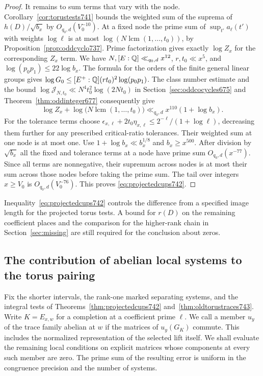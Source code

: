 \documentclass[a4paper,11pt]{article}
\theoremstyle{definition}
\theoremstyle{remark}
\numberwithin{equation}{section}
\begin{document}
\begin{proof}
It remains to sum terms that vary with the node.
Corollary~\ref{cor:torustests741} bounds the weighted sum of
the suprema of \(h(D)/\sqrt{b_x}\) by \(O_{q_0,d}(V_0^{-10})\).
At a fixed node the prime sum of \(\sup_{t'}a_\ell(t')\)
with weights \(\log\ell\) is at most
\(\log(N\operatorname{lcm}(1,\ldots,t_0))\), by
Proposition~\ref{prop:oddcyclo737}. Prime factorization gives
exactly \(\log Z_x\) for the corresponding \(Z_x\) term.
We have \(N,[E:\mathbb Q]\ll_{q_0,d}x^{12}\),
\(r,t_0\ll x^5\), and \(\log(p_0p_1)\le22\log b_x\).
The formula for the orders of the finite general linear groups
gives \(\log G_0\le [E^+:\mathbb Q](r t_0)^2\log(p_0p_1)\).
The class number estimate and the bound
\(\log\mathcal J_{N,t_0}\ll N^4t_0^2\log(2Nt_0)\) in
Section~\ref{sec:oddcocycles675} and
Theorem~\ref{thm:oddinteger677} consequently give
\[
 \log Z_x+\log\!\bigl(N\operatorname{lcm}(1,\ldots,t_0)\bigr)
                 \ll_{q_0,d} x^{110}(1+\log b_x).
\]
For the tolerance terms choose
\(\epsilon_{x,\ell}+2t_0\eta_{x,\ell}
 \le 2^{-\ell}/(1+\log\ell)\), decreasing them further for
any prescribed critical-ratio tolerances. Their weighted sum
at one node is at most one. Use \(1+\log b_x\ll b_x^{1/8}\)
and \(b_x\ge x^{500}\). After division by \(\sqrt{b_x}\)
all the fixed and tolerance terms at a node have prime sum
\(O_{q_0,d}(x^{-77})\). Since all terms are nonnegative, their
supremum across nodes is at most their sum across those nodes
before taking the prime sum. The tail over integers \(x\ge V_0\)
is \(O_{q_0,d}(V_0^{-76})\). This proves
\eqref{eq:projectedcups742}.
\end{proof}

Inequality~\eqref{eq:projectedcups742} controls the difference
from a specified image length for the projected torus tests.
A bound for \(r(D)\) on the remaining coefficient places and
the comparison for the higher-rank chain in
Section~\ref{sec:missing} are still required for the conclusion
about zeros.
\clearpage

\subsection{The contribution of abelian local systems to the torus pairing}
\label{sec:abelianperiod744}

Fix the shorter intervals, the rank-one marked separating systems,
and the integral tests of Theorems~\ref{thm:projectedcups742}
and~\ref{thm:oldtorustraces743}. Write \(K=E_{x,w}\) for a
completion at a coefficient prime \(\ell\). We call a member
\(u_y\) of the trace family abelian at \(w\) if the matrices of
\(u_y(G_K)\) commute. This includes the normalized representation
of the selected lift itself. We shall evaluate the remaining
local conditions on explicit matrices whose components at every
such member are zero. The prime sum of the resulting error is
uniform in the congruence precision and the number of systems.
\end{document}
